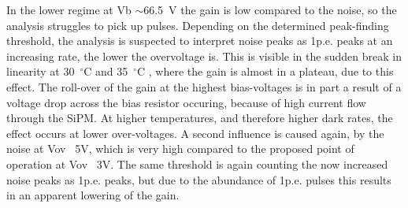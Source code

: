 \documentclass[12pt,article,type=msc,colorback,accentcolor=tud9c]{tudthesis}
\begin{document}
In the lower regime at Vb $\sim$66.5~V the gain is low compared to the noise, so the analysis struggles to pick up pulses. Depending on the determined peak-finding threshold, the analysis is suspected to interpret noise peaks as 1p.e. peaks at an increasing rate, the lower the overvoltage is. This is visible in the sudden break in linearity at 30~$^{\circ}$C and 35~$^{\circ}$C , where the gain is almost in a plateau, due to this effect. The roll-over of the gain at the highest bias-voltages is in part a result of a voltage drop across the bias resistor occuring, because of high current flow through the SiPM. At higher temperatures, and therefore higher dark rates, the effect occurs at lower over-voltages. A second influence is caused again, by the noise at Vov ~5V, which is very high compared to the proposed point of operation at Vov ~3V. The same threshold is again counting the now increased noise peaks as 1p.e. peaks, but due to the abundance of 1p.e. pulses this results in an apparent lowering of the gain.



\end{document}
